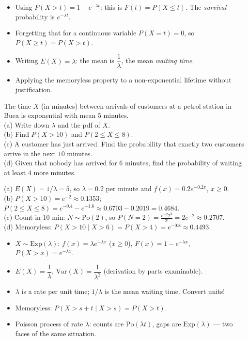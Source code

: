 \documentclass[11pt]{article}
\begin{document}
\begin{attention}
\begin{itemize}
\item Using $P(X > t) = 1 - e^{-\lambda t}$: this is $F(t) = P(X \leq t)$. The \emph{survival} probability is $e^{-\lambda t}$.
\item Forgetting that for a continuous variable $P(X = t) = 0$, so $P(X \geq t) = P(X > t)$.
\item Writing $E(X) = \lambda$: the mean is $\dfrac{1}{\lambda}$, the mean \emph{waiting time}.
\item Applying the memoryless property to a non-exponential lifetime without justification.
\end{itemize}
\end{attention}

\begin{exercice}[Practice]
The time $X$ (in minutes) between arrivals of customers at a petrol station in Buea is exponential with mean $5$ minutes.\\
(a) Write down $\lambda$ and the pdf of $X$.\\
(b) Find $P(X > 10)$ and $P(2 \leq X \leq 8)$.\\
(c) A customer has just arrived. Find the probability that exactly two customers arrive in the next $10$ minutes.\\
(d) Given that nobody has arrived for $6$ minutes, find the probability of waiting at least $4$ more minutes.
\end{exercice}

\begin{corrige}[Exercise 1]
(a) $E(X) = 1/\lambda = 5$, so $\lambda = 0.2$ per minute and $f(x) = 0.2e^{-0.2x}$, $x \geq 0$.\\
(b) $P(X > 10) = e^{-2} \approx 0.1353$; $P(2 \leq X \leq 8) = e^{-0.4} - e^{-1.6} \approx 0.6703 - 0.2019 = 0.4684$.\\
(c) Count in $10$ min: $N \sim \mathrm{Po}(2)$, so $P(N = 2) = \frac{e^{-2}2^2}{2!} = 2e^{-2} \approx 0.2707$.\\
(d) Memoryless: $P(X > 10 \mid X > 6) = P(X > 4) = e^{-0.8} \approx 0.4493$.
\end{corrige}

\begin{aretenir}
\begin{itemize}
\item $X \sim \mathrm{Exp}(\lambda)$: $f(x) = \lambda e^{-\lambda x}$ ($x \geq 0$), $F(x) = 1 - e^{-\lambda x}$, $P(X > x) = e^{-\lambda x}$.
\item $E(X) = \dfrac{1}{\lambda}$, $\mathrm{Var}(X) = \dfrac{1}{\lambda^2}$ (derivation by parts examinable).
\item $\lambda$ is a rate per unit time; $1/\lambda$ is the mean waiting time. Convert units!
\item Memoryless: $P(X > s+t \mid X > s) = P(X > t)$.
\item Poisson process of rate $\lambda$: counts are $\mathrm{Po}(\lambda t)$, gaps are $\mathrm{Exp}(\lambda)$ — two faces of the same situation.
\end{itemize}
\end{aretenir}
\end{document}
